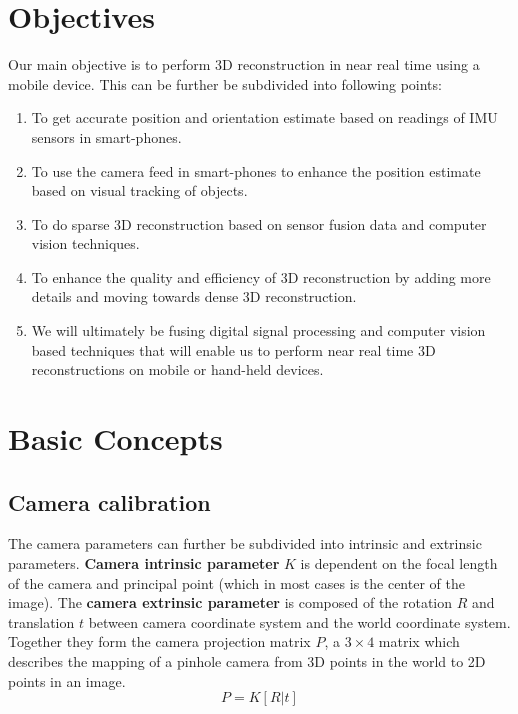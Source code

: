\documentclass{article}
\begin{document}
	\section{Objectives} 
		Our main objective is to perform 3D reconstruction in near real time using a mobile device. This can be further be subdivided into following points:
		\begin{enumerate}
			\item 
				To get accurate position and orientation estimate based on readings of IMU sensors in smart-phones. 
			\item
				To use the camera feed in smart-phones to enhance the position estimate based on visual tracking of objects.
			\item 
				To do sparse 3D reconstruction based on sensor fusion data and computer vision techniques.
			\item
				To enhance the quality and efficiency of 3D reconstruction by adding more details and moving towards dense 3D reconstruction.
			\item
				We will ultimately be fusing digital signal processing and computer vision based techniques that will enable us to perform near real time 3D reconstructions on mobile or hand-held devices.
		\end{enumerate}

\section{Basic Concepts} 
			\subsection{Camera calibration}
				The camera parameters can further be subdivided into intrinsic and extrinsic parameters. \textbf{Camera intrinsic parameter} $K$ is dependent on the focal length of the camera and principal point (which in most cases is the center of the image). The \textbf{camera extrinsic parameter} is composed of the rotation $R$ and translation $t$ between camera coordinate system and the world coordinate system. Together they form the camera projection matrix $P$, a $3 \times 4$ matrix which describes the mapping of a pinhole camera from 3D points in the world to 2D points in an image.
				\begin{equation}
				P = K[R|t]
				\end{equation}
			
\end{document}
